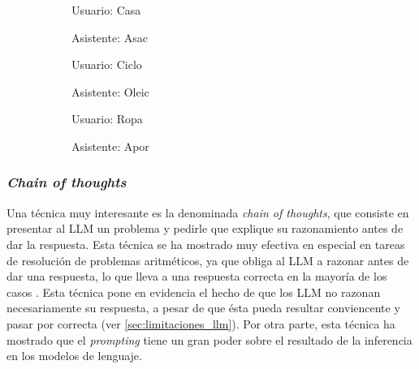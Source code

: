 \begin{figure}[H]
    \caption[Técnica de \textit{few-shot prompting}]{Técnica de \textit{few-shot prompting}. El LLM recibe como input una serie de pares <<petición-respuesta>> más una petición a la cual ha de responder de forma análoga al contexto. En este caso, el LLM, con papel de <<asistente>>, ha de devolver el input del <<usuario>> con las letras invertidas. Sin embargo, nunca se le pide explícitamente que invierta las letras, sino que lo ha de inferir a partir de los ejemplos.}
    \centering
    \begin{subfigure}{.48\textwidth}
      \centering
      \begin{mdframed}
        Usuario: Casa
        \vspace{0.1cm}

        Asistente: Asac
        \vspace{0.1cm}

        Usuario: Ciclo
        \vspace{0.1cm}

        Asistente: Oleic
        \vspace{0.1cm}

        Usuario: Ropa
        \vspace{0.2cm}
      \end{mdframed}
    \end{subfigure}\hfill

    \vspace{0.2cm}

    \begin{subfigure}{.48\textwidth}
        \centering
        \begin{mdframed}
        Asistente: Apor
        \end{mdframed}
      \end{subfigure}\hfill

      \label{fig:few_shot_prompting}
\end{figure}

\subsubsection{\textit{Chain of thoughts}}

Una técnica muy interesante es la denominada \textit{chain of thoughts}, que consiste en presentar al LLM un problema y pedirle que explique su razonamiento antes de dar la respuesta. Esta técnica se ha mostrado muy efectiva en especial en tareas de resolución de problemas aritméticos, ya que obliga al LLM a razonar antes de dar una respuesta, lo que lleva a una respuesta correcta en la mayoría de los casos \citep{weiChainofThoughtPromptingElicits2023}. Esta técnica pone en evidencia el hecho de que los LLM no razonan necesariamente su respuesta, a pesar de que ésta pueda resultar conviencente y pasar por correcta (ver \ref{sec:limitaciones_llm}). Por otra parte, esta técnica ha mostrado que el \textit{prompting} tiene un gran poder sobre el resultado de la inferencia en los modelos de lenguaje. 

